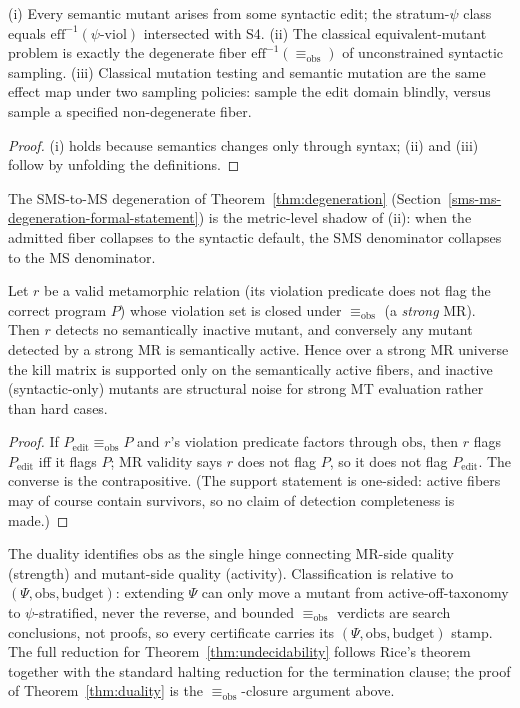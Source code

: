 \documentclass[manuscript,screen,review]{acmart}
\begin{document}
\begin{proposition}\label{prop:fiber}
(i) Every semantic mutant arises from some syntactic edit; the
stratum-$\psi$ class equals $\mathrm{eff}^{-1}(\psi\text{-viol})$ intersected
with S4. (ii) The classical equivalent-mutant problem is exactly the
degenerate fiber $\mathrm{eff}^{-1}(\equiv_{\mathrm{obs}})$ of unconstrained syntactic
sampling. (iii) Classical mutation testing and semantic mutation are the
same effect map under two sampling policies: sample the edit domain
blindly, versus sample a specified non-degenerate fiber.
\end{proposition}

\begin{proof}
(i) holds because semantics changes only through syntax; (ii) and (iii)
follow by unfolding the definitions.
\end{proof}

The SMS-to-MS degeneration of
Theorem~\ref{thm:degeneration} (Section~\ref{sms-ms-degeneration-formal-statement}) is the metric-level shadow of (ii): when the admitted
fiber collapses to the syntactic default, the SMS denominator collapses
to the MS denominator.

\begin{theorem}\label{thm:duality}
Let $r$ be a valid
metamorphic relation (its violation predicate does not flag the correct
program $P$) whose violation set is closed under $\equiv_{\mathrm{obs}}$
(a \emph{strong} MR). Then $r$ detects no semantically inactive
mutant, and conversely any mutant detected by a strong MR is
semantically active. Hence over a strong MR universe the kill matrix
is supported only on the semantically active fibers, and inactive
(syntactic-only) mutants are structural noise for strong MT evaluation
rather than hard cases.
\end{theorem}

\begin{proof}
If $P_{\mathrm{edit}} \equiv_{\mathrm{obs}} P$ and $r$'s
violation predicate factors through $\mathrm{obs}$, then $r$ flags $P_{\mathrm{edit}}$ iff
it flags $P$; MR validity says $r$ does not flag $P$, so it does not
flag $P_{\mathrm{edit}}$. The converse is the contrapositive. (The
support statement is one-sided: active fibers may of course contain
survivors, so no claim of detection completeness is made.)
\end{proof}

The duality identifies $\mathrm{obs}$ as the single hinge connecting MR-side
quality (strength) and mutant-side quality (activity). Classification
is relative to $(\Psi, \mathrm{obs}, \text{budget})$: extending $\Psi$ can only move
a mutant from active-off-taxonomy to $\psi$-stratified, never the
reverse, and bounded $\equiv_{\mathrm{obs}}$ verdicts are search conclusions,
not proofs, so every certificate carries its $(\Psi, \mathrm{obs}, \text{budget})$
stamp. The full reduction for Theorem~\ref{thm:undecidability} follows Rice's theorem together
with the standard halting reduction for the termination clause; the
proof of Theorem~\ref{thm:duality} is the $\equiv_{\mathrm{obs}}$-closure argument above.
\end{document}
